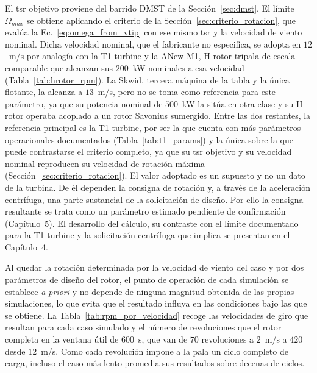 El \gls{tsr} objetivo proviene del barrido DMST de la Sección~\ref{sec:dmst}. El límite $\Omega_{max}$ se obtiene aplicando el criterio de la Sección~\ref{sec:criterio_rotacion}, que evalúa la Ec.~\ref{eq:omega_from_vtip} con ese mismo \gls{tsr} y la velocidad de viento nominal. Dicha velocidad nominal, que el fabricante no especifica, se adopta en $12$~m/s por analogía con la T1-turbine y la ANew-M1, H-rotor tripala de escala comparable que alcanzan sus $200$~kW nominales a esa velocidad (Tabla~\ref{tab:hrotor_rpm}). La Skwid, tercera máquina de la tabla y la única flotante, la alcanza a $13$~m/s, pero no se toma como referencia para este parámetro, ya que su potencia nominal de $500$~kW la sitúa en otra clase y su H-rotor operaba acoplado a un rotor Savonius sumergido. Entre las dos restantes, la referencia principal es la T1-turbine, por ser la que cuenta con más parámetros operacionales documentados (Tabla~\ref{tab:t1_params}) y la única sobre la que puede contrastarse el criterio completo, ya que su \gls{tsr} objetivo y su velocidad nominal reproducen su velocidad de rotación máxima (Sección~\ref{sec:criterio_rotacion}). El valor adoptado es un supuesto y no un dato de la turbina. De él dependen la consigna de rotación y, a través de la aceleración centrífuga, una parte sustancial de la solicitación de diseño. Por ello la consigna resultante se trata como un parámetro estimado pendiente de confirmación (Capítulo~5). El desarrollo del cálculo, su contraste con el límite documentado para la T1-turbine y la solicitación centrífuga que implica se presentan en el Capítulo~4.

Al quedar la rotación determinada por la velocidad de viento del caso y por dos parámetros de diseño del rotor, el punto de operación de cada simulación se establece \textit{a priori} y no depende de ninguna magnitud obtenida de las propias simulaciones, lo que evita que el resultado influya en las condiciones bajo las que se obtiene. La Tabla~\ref{tab:rpm_por_velocidad} recoge las velocidades de giro que resultan para cada caso simulado y el número de revoluciones que el rotor completa en la ventana útil de $600$~s, que van de $70$ revoluciones a $2$~m/s a $420$ desde $12$~m/s. Como cada revolución impone a la pala un ciclo completo de carga, incluso el caso más lento promedia sus resultados sobre decenas de ciclos.

